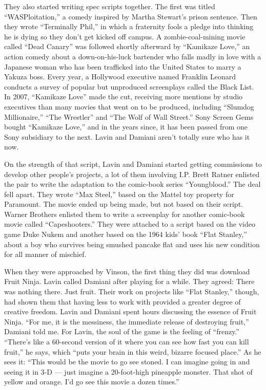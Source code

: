 They also started writing spec scripts together. The first was titled
``WASPloitation,'' a comedy inspired by Martha Stewart's prison
sentence. Then they wrote ``Terminally Phil,'' in which a fraternity
fools a pledge into thinking he is dying so they don't get kicked off
campus. A zombie-­coal-­mining movie called ``Dead Canary'' was followed
shortly afterward by ``Kamikaze Love,'' an action comedy about a
down-on-his-luck bartender who falls madly in love with a Japanese woman
who has been trafficked into the United States to marry a Yakuza boss.
Every year, a Hollywood executive named Franklin Leonard conducts a
survey of popular but unproduced screenplays called the Black List. In
2007, ``Kamikaze Love'' made the cut, receiving more mentions by studio
executives than many movies that went on to be produced, including
``Slumdog Millionaire,'' ``The Wrestler'' and ``The Wolf of Wall
Street.'' Sony Screen Gems bought ``Kamikaze Love,'' and in the years
since, it has been passed from one Sony subsidiary to the next. Lavin
and Damiani aren't totally sure who has it now.

On the strength of that script, Lavin and Damiani started getting
commissions to develop other people's projects, a lot of them involving
I.P. Brett Ratner enlisted the pair to write the adaptation to the
comic-­book series ``Youngblood.'' The deal fell apart. They wrote ``Max
Steel,'' based on the Mattel toy property for Paramount. The movie ended
up being made, but not based on their script. Warner Brothers enlisted
them to write a screenplay for another comic-­book movie called
``Capeshooters.'' They were attached to a script based on the video game
Duke Nukem and another based on the 1964 kids' book ``Flat Stanley,''
about a boy who survives being smushed pancake flat and uses his new
condition for all manner of mischief.

When they were approached by Vinson, the first thing they did was
download Fruit Ninja. Lavin called Damiani after playing for a while.
They agreed: There was nothing there. Just fruit. Their work on projects
like ``Flat Stanley,'' though, had shown them that having less to work
with provided a greater degree of creative freedom. Lavin and Damiani
spent hours discussing the essence of Fruit Ninja. ``For me, it is the
messiness, the immediate release of destroying fruit,'' Damiani told me.
For Lavin, the soul of the game is the feeling of ``frenzy.'' ``There's
like a 60-­second version of it where you can see how fast you can kill
fruit,'' he says, which ``puts your brain in this weird, bizarre focused
place.'' As he sees it: ``This would be the movie to go see stoned. I
can imagine going in and seeing it in 3-D --- just imagine a
20-foot-high pineapple monster. That shot of yellow and orange. I'd go
see this movie a dozen times.''

